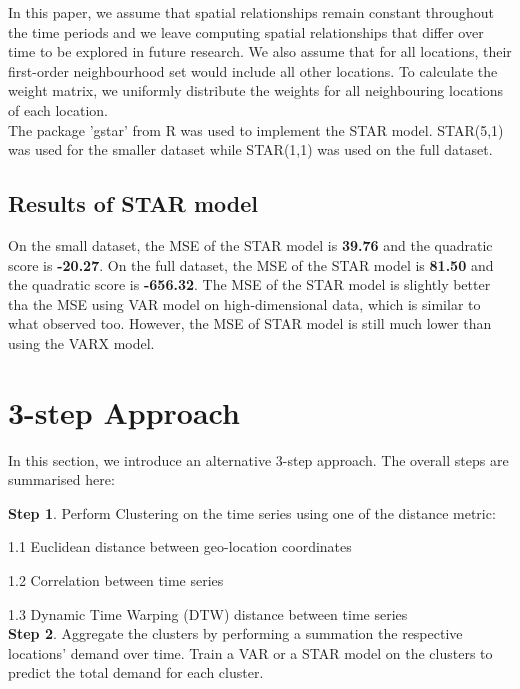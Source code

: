 \documentclass[nonblindrev,msom]{informs3} %
\begin{document}
\noindent In this paper, we assume that spatial relationships remain constant throughout the time periods and we leave computing spatial relationships that differ over time to be explored in future research. We also assume that for all locations, their first-order neighbourhood set would include all other locations. To calculate the weight matrix, we uniformly distribute the weights for all neighbouring locations of each location. \\

\noindent The package 'gstar' from R was used to implement the STAR model. STAR(5,1) was used for the smaller dataset while STAR(1,1) was used on the full dataset.

\subsection{Results of STAR model}

On the small dataset, the MSE of the STAR model is \textbf{39.76} and the quadratic score is \textbf{-20.27}. On the full dataset, the MSE of the STAR model is \textbf{81.50} and the quadratic score is \textbf{-656.32}. The MSE of the STAR model is slightly better tha the MSE using VAR model on high-dimensional data, which is similar to what \cite{Abolfazl2017} observed too. However, the MSE of STAR model is still much lower than using the VARX model. 

\newpage
\section{3-step Approach}

In this section, we introduce an alternative 3-step approach. The overall steps are summarised here:

\noindent \textbf{Step 1}. Perform Clustering on the time series using one of the distance metric: 

	1.1 Euclidean distance between geo-location coordinates
	
	1.2 Correlation between time series 
	
	1.3 Dynamic Time Warping (DTW) distance between time series \\
	
	
	
\noindent \textbf{Step 2}. Aggregate the clusters by performing a summation the respective locations' demand over time. Train a VAR or a STAR model on the clusters to predict the total demand for each cluster. \\
\end{document}

